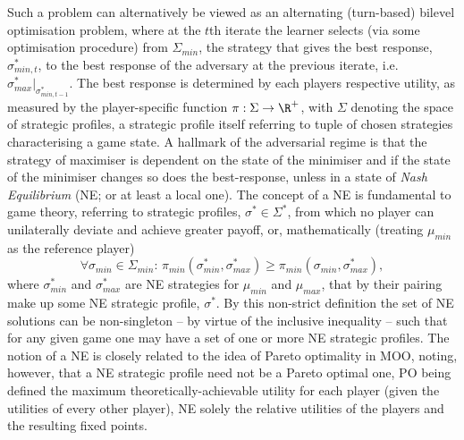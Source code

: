 %
Such a problem can alternatively be viewed as an alternating (turn-based) bilevel optimisation
problem, where at the \(t\)th iterate the learner selects (via some optimisation procedure) from \(
\Sigma_{min} \), the strategy that gives the best response, \(\sigma_{min, t}^{\ast}\), to the best
response of the adversary at the previous iterate, i.e. \( \sigma_{max}^\ast|_{\sigma_{min,t-1}^\ast} \).
%
The best response is determined by each players respective utility, as measured by the
player-specific function \(\pi: \Sigma \to \R^+\), with \(\Sigma\) denoting the space of strategic
profiles,  a strategic profile itself referring to tuple of chosen strategies characterising a game
state.
%
%
A hallmark of the adversarial regime is that the strategy of maximiser is dependent on the
state of the minimiser and if the state of the minimiser changes so does the best-response, unless 
in a state of \emph{Nash Equilibrium} (NE; or at least a local one).  
%
The concept of a NE is fundamental to game theory, referring to strategic profiles, \(\sigma^\ast \in
\Sigma^\ast\), from which no player can unilaterally deviate and achieve greater payoff, or,
mathematically (treating \(\mu_{min}\) as the reference player)
%
\begin{equation}
  \forall \sigma_{min} \in \Sigma_{min}:\, \pi_{min} ( \sigma^\ast_{min}, \sigma^\ast_{max} ) \ge \pi_{min}(
  \sigma_{min}, \sigma^\ast_{max} ),
\end{equation}
%
where \(\sigma^\ast_{min}\) and \(\sigma^\ast_{max} \) are NE strategies for \(\mu_{min}\) and \( \mu_{max}
\), that by their pairing make up some NE strategic profile, \(\sigma^\ast\).
%
%
By this non-strict definition the set of NE solutions can be non-singleton -- by virtue of the
inclusive inequality -- such that for any given game one may have a set of one or more NE strategic
profiles.
%
The notion of a NE is closely related to the idea of Pareto optimality in MOO, noting, however,
that a NE strategic profile need not be a Pareto optimal one, PO being defined \wrt{} the maximum
theoretically-achievable utility for each player (given the utilities of every other player), NE
solely \wrt{} the relative utilities of the players and the resulting fixed points.

